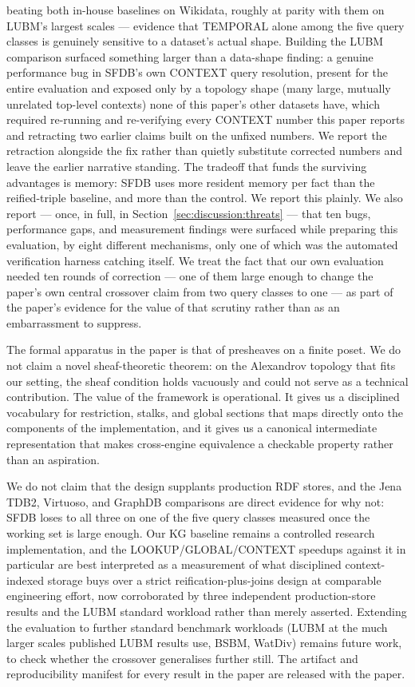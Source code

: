 beating both in-house baselines on Wikidata, roughly at parity with
them on LUBM's largest scales --- evidence that TEMPORAL alone among
the five query classes is genuinely sensitive to a dataset's actual
shape. Building the LUBM comparison surfaced something larger than a
data-shape finding: a genuine performance bug in SFDB's own CONTEXT
query resolution, present for the entire evaluation and exposed only by
a topology shape (many large, mutually unrelated top-level contexts)
none of this paper's other datasets have, which required re-running and
re-verifying every CONTEXT number this paper reports and retracting two
earlier claims built on the unfixed numbers. We report the retraction
alongside the fix rather than quietly substitute corrected numbers and
leave the earlier narrative standing. The
tradeoff that funds the surviving advantages is memory: SFDB uses
\rangememkg{} more resident memory per fact than the reified-triple
baseline, and \rangememkgmem{} more than the control. We report this
plainly. We also report --- once, in
full, in Section~\ref{sec:discussion:threats} --- that ten bugs,
performance gaps, and measurement findings were surfaced while preparing this evaluation,
by eight different mechanisms, only one of which was the automated
verification harness catching itself. We treat the fact that our own
evaluation needed ten rounds of correction --- one of them large enough
to change the paper's own central crossover claim from two query
classes to one --- as part of the paper's
evidence for the value of that scrutiny rather than as an embarrassment
to suppress.

The formal apparatus in the paper is that of presheaves on a finite poset.
We do not claim a novel sheaf-theoretic theorem: on the Alexandrov topology
that fits our setting, the sheaf condition holds vacuously and could not
serve as a technical contribution. The value of the framework is
operational. It gives us a disciplined vocabulary for restriction, stalks,
and global sections that maps directly onto the components of the
implementation, and it gives us a canonical intermediate representation
that makes cross-engine equivalence a checkable property rather than an
aspiration.

We do not claim that the design supplants production RDF stores, and the
Jena TDB2, Virtuoso, and GraphDB comparisons are direct evidence for
why not: SFDB
loses to all three on one of the five query classes measured once the
working set is large enough. Our KG
baseline remains a controlled research implementation, and the
LOOKUP/GLOBAL/CONTEXT speedups against it in particular
are best interpreted as a measurement of what disciplined context-indexed
storage buys over a strict reification-plus-joins design at comparable
engineering effort, now corroborated by three independent production-store
results and the LUBM standard workload rather than merely asserted. Extending the evaluation to
further
standard benchmark workloads (LUBM at the much larger scales published
LUBM results use, BSBM, WatDiv) remains future work, to check
whether the crossover generalises further still. The artifact and reproducibility
manifest for every result in the paper are released with the paper.
